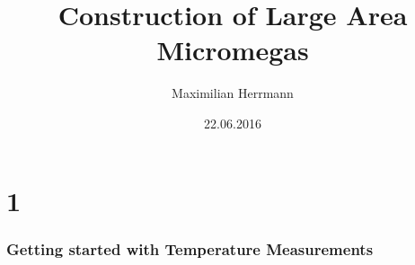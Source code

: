 \documentclass{beamer}
\begin{document}
\title{Construction of Large Area Micromegas}  
\author{ Maximilian Herrmann}
\date{22.06.2016} 

\part{1}




\section{Getting started with Temperature Measurements} 
\end{document}
